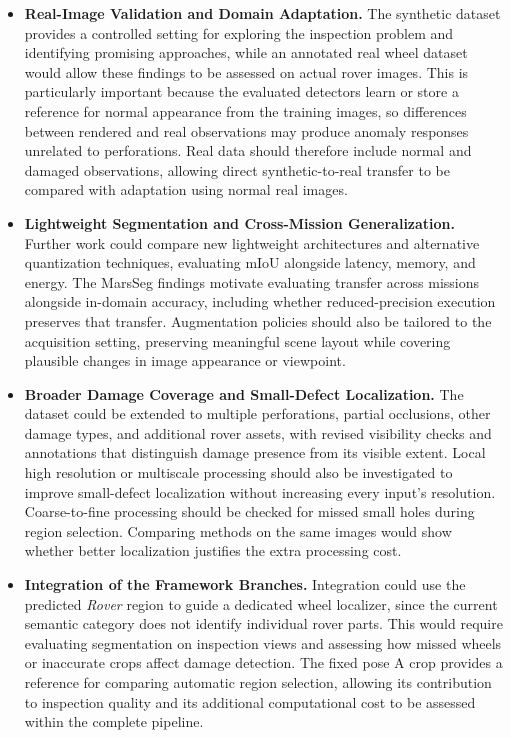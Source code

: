 \begin{itemize}

      \item \textbf{Real-Image Validation and Domain Adaptation.}
            The synthetic dataset provides a controlled setting for exploring the inspection problem and identifying promising approaches, while an annotated real wheel dataset would allow these findings to be assessed on actual rover images. This is particularly important because the evaluated detectors learn or store a reference for normal appearance from the training images, so differences between rendered and real observations may produce anomaly responses unrelated to perforations. Real data should therefore include normal and damaged observations, allowing direct synthetic-to-real transfer to be compared with adaptation using normal real images.

      \item \textbf{Lightweight Segmentation and Cross-Mission Generalization.}
            Further work could compare new lightweight architectures and alternative quantization techniques, evaluating mIoU alongside latency, memory, and energy. The MarsSeg findings motivate evaluating transfer across missions alongside in-domain accuracy, including whether reduced-precision execution preserves that transfer. Augmentation policies should also be tailored to the acquisition setting, preserving meaningful scene layout while covering plausible changes in image appearance or viewpoint.

      \item \textbf{Broader Damage Coverage and Small-Defect Localization.}
            The dataset could be extended to multiple perforations, partial occlusions, other damage types, and additional rover assets, with revised visibility checks and annotations that distinguish damage presence from its visible extent. Local high resolution or multiscale processing should also be investigated to improve small-defect localization without increasing every input's resolution. Coarse-to-fine processing should be checked for missed small holes during region selection. Comparing methods on the same images would show whether better localization justifies the extra processing cost.

      \item \textbf{Integration of the Framework Branches.}
            Integration could use the predicted \emph{Rover} region to guide a dedicated wheel localizer, since the current semantic category does not identify individual rover parts. This would require evaluating segmentation on inspection views and assessing how missed wheels or inaccurate crops affect damage detection. The fixed pose A crop provides a reference for comparing automatic region selection, allowing its contribution to inspection quality and its additional computational cost to be assessed within the complete pipeline.


\end{itemize}
